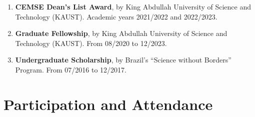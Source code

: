 \documentclass[10pt, ]{article}
\begin{document}
	\begin{enumerate}[noitemsep, topsep=0pt]
		\item \textbf{CEMSE Dean's List Award}, by King Abdullah University of Science and Technology (KAUST). Academic years 2021/2022 and 2022/2023.
		
		\item \textbf{Graduate Fellowship}, by King Abdullah University of Science and Technology (KAUST). From 08/2020 to 12/2023. %
		
		
		\item \textbf{Undergraduate Scholarship}, by Brazil's ``Science without Borders'' Program. From 07/2016 to 12/2017. %
		
		
	\end{enumerate}
	
	\vspace{10pt}
	
	\vspace{-12pt}
	\section*{Participation and Attendance} \vspace{-5pt}
	
\end{document}
